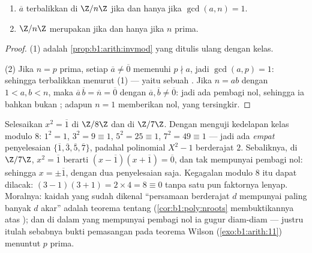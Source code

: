 \begin{theorem}\label{thm:b1:structures:zp}
\begin{enumerate}
  \item $\overline a$ terbalikkan di $\Z/n\Z$ jika dan hanya jika
        $\gcd(a, n) = 1$.
  \item $\Z/n\Z$ merupakan  jika dan hanya jika $n$ prima.
\end{enumerate}
\end{theorem}

\begin{proof}
(1) adalah \cref{prop:b1:arith:invmod} yang ditulis ulang dengan kelas.

(2) Jika $n = p$ prima, setiap $\overline a \neq \overline 0$ memenuhi $p
\nmid a$, jadi $\gcd(a, p) = 1$: sehingga terbalikkan menurut (1) --- yaitu sebuah . Jika $n =
ab$ dengan $1 < a, b < n$, maka $\overline a\, \overline b = \overline
n = \overline 0$ dengan $\overline a, \overline b \neq \overline 0$:
jadi ada pembagi nol, sehingga ia bahkan bukan ; adapun $n = 1$ memberikan
 nol, yang tersingkir.
\end{proof}

\begin{example}\label{ex:b1:structures:sqrtone}
Selesaikan $x^2 = \overline 1$ di $\Z/8\Z$ dan di $\Z/7\Z$. Dengan menguji
kedelapan kelas modulo $8$: $1^2 = 1$, $3^2 = 9 \equiv 1$, $5^2 = 25
\equiv 1$, $7^2 = 49 \equiv 1$ --- jadi ada \emph{empat} penyelesaian
$\{\overline1, \overline3, \overline5, \overline7\}$, padahal
polinomial $X^2 - 1$ berderajat $2$. Sebaliknya, di  $\Z/7\Z$,
$x^2 = \overline1$ berarti $(x - \overline1)(x +
\overline1) = \overline0$, dan  tak mempunyai pembagi nol: sehingga $x =
\pm\overline1$, dengan dua penyelesaian saja. Kegagalan modulo $8$ itu dapat
dilacak: $(3-1)(3+1) = 2 \times 4 = 8 \equiv 0$ tanpa satu pun
faktornya lenyap. Moralnya: kaidah yang sudah dikenal ``persamaan berderajat
$d$ mempunyai paling banyak $d$ akar'' adalah teorema tentang
\emph{} (\cref{cor:b1:poly:nroots} membuktikannya atas
); dan di dalam  yang mempunyai pembagi nol ia gugur diam-diam --- justru
itulah sebabnya bukti pemasangan pada teorema Wilson
(\cref{exo:b1:arith:11}) menuntut $p$ prima.
\end{example}


